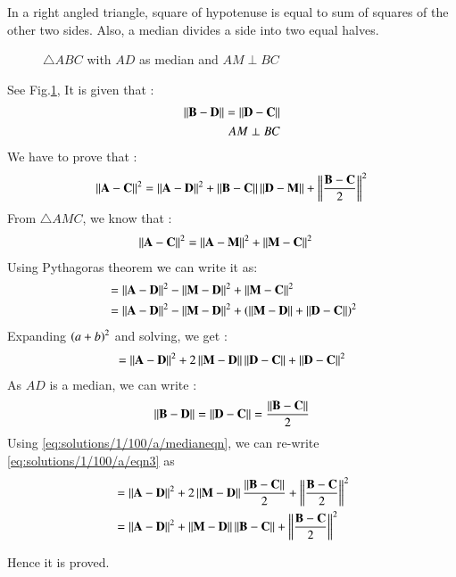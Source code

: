 
In a right angled triangle, square of hypotenuse is equal to sum of squares of the other two sides. Also, a median divides a side into two equal halves.


\begin{figure}[!ht]
\centering
\resizebox{\columnwidth}{!}{}
\caption{$\triangle{ABC}$ with $AD$ as median and $AM \perp BC$}
\label{eq:solutions/1/100/a/fig:triangle}
\end{figure}

See Fig.\ref{eq:solutions/1/100/a/fig:triangle}, It is given that :
\begin{align}\label{eq:solutions/1/100/a/given}
  \left\lVert\mathbf{B-D}\right\rVert = \left\lVert\mathbf{D-C}\right\rVert\\
  AM \perp BC
\end{align}
We have to prove that :
\begin{align}\label{eq:solutions/1/100/a/toprove}
  \left\lVert\mathbf{A-C}\right\rVert^2 = \left\lVert\mathbf{A-D}\right\rVert^2 + \left\lVert\mathbf{B-C}\right\rVert\left\lVert\mathbf{D-M}\right\rVert + \left\lVert\frac{\mathbf{B-C}}{2}\right\rVert^2
\end{align}
From $\triangle AMC$, we know that :
\begin{align}\label{eq:solutions/1/100/a/eqn1}
    \left\lVert\mathbf{A-C}\right\rVert^2 &= \left\lVert\mathbf{A-M}\right\rVert^2 + \left\lVert\mathbf{M-C}\right\rVert^2
\end{align}
Using Pythagoras theorem we can write it as:
\begin{align}\label{eq:solutions/1/100/a/eqn2}
    &= \left\lVert\mathbf{A-D}\right\rVert^2 - \left\lVert\mathbf{M-D}\right\rVert^2+ \left\lVert\mathbf{M-C}\right\rVert^2\\
    &= \left\lVert\mathbf{A-D}\right\rVert^2 - \left\lVert\mathbf{M-D}\right\rVert^2+ \left(\left\lVert\mathbf{M-D}\right\rVert + \left\lVert\mathbf{D-C}\right\rVert\right)^2 
\end{align}
Expanding $\left(a+b\right)^2$ and solving, we get :
\begin{align}\label{eq:solutions/1/100/a/eqn3}
   = \left\lVert\mathbf{A-D}\right\rVert^2 + 2\left\lVert\mathbf{M-D}\right\rVert\left\lVert\mathbf{D-C}\right\rVert + \left\lVert\mathbf{D-C}\right\rVert^2
\end{align}
As $AD$ is a median, we can write : 
\begin{align}\label{eq:solutions/1/100/a/medianeqn}
    \left\lVert\mathbf{B-D}\right\rVert = \left\lVert\mathbf{D-C}\right\rVert = \frac{\left\lVert\mathbf{B-C}\right\rVert}{2}
\end{align}
Using \eqref{eq:solutions/1/100/a/medianeqn}, we can re-write \eqref{eq:solutions/1/100/a/eqn3} as
\begin{align}\label{eq:solutions/1/100/a/eqn4}
   &= \left\lVert\mathbf{A-D}\right\rVert^2 + 2\left\lVert\mathbf{M-D}\right\rVert\frac{\left\lVert\mathbf{B-C}\right\rVert}{2} + \left\lVert\frac{\mathbf{B-C}}{2}\right\rVert^2 \nonumber\\
   &=  \left\lVert\mathbf{A-D}\right\rVert^2 + \left\lVert\mathbf{M-D}\right\rVert\left\lVert\mathbf{B-C}\right\rVert + \left\lVert\frac{\mathbf{B-C}}{2}\right\rVert^2
\end{align}

Hence it is proved.
